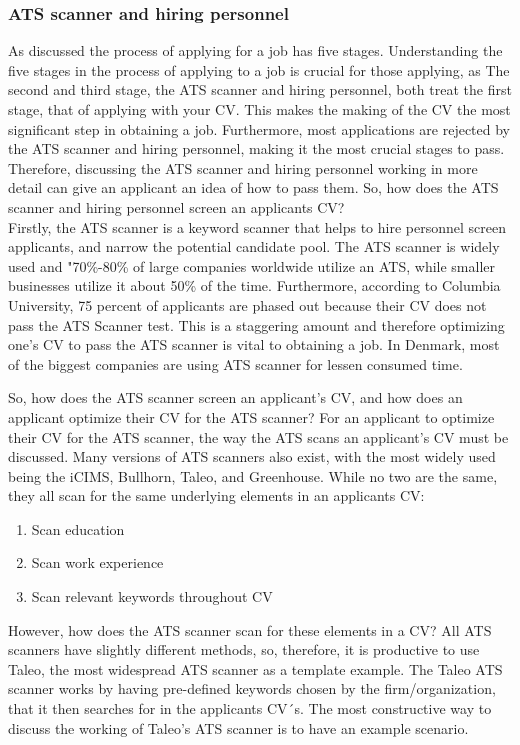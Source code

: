 \subsubsection{ATS scanner and hiring personnel}
As discussed the process of applying for a job has five stages.
Understanding the five stages in the process of applying to a job is crucial for those applying, as 
The second and third stage, the ATS scanner and hiring personnel, both treat the first stage, that of applying with your CV.
This makes the making of the CV the most significant step in obtaining a job.
Furthermore, most applications are rejected by the ATS scanner and hiring personnel, making it the most crucial stages to pass.
Therefore, discussing the ATS scanner and hiring personnel working in more detail can give an applicant an idea of how to pass them.
So, how does the ATS scanner and hiring personnel screen an applicants CV? \\

Firstly, the ATS scanner is a keyword scanner that helps to hire personnel screen applicants, and narrow the potential candidate pool.
The ATS scanner is widely used and "70\%-80\% of large companies worldwide utilize an ATS, while smaller businesses utilize it about 50\% of the time.\cite{ATS_Usage}
Furthermore, according to Columbia University, 75 percent of applicants are phased out because their CV does not pass the ATS Scanner test.
This is a staggering amount and therefore optimizing one's CV to pass the ATS scanner is vital to obtaining a job.
In Denmark, most of the biggest companies are using ATS scanner for lessen consumed time.\cite{ATS_Denmark}

So, how does the ATS scanner screen an applicant's CV, and how does an applicant optimize their CV for the ATS scanner?
For an applicant to optimize their CV for the ATS scanner, the way the ATS scans an applicant's CV must be discussed.
Many versions of ATS scanners also exist, with the most widely used being the iCIMS, Bullhorn, Taleo, and Greenhouse.
While no two are the same, they all scan for the same underlying elements in an applicants CV:
\begin{enumerate}
   \item Scan education
   \item Scan work experience
   \item Scan relevant keywords throughout CV
\end{enumerate}
However, how does the ATS scanner scan for these elements in a CV?
All ATS scanners have slightly different methods, so, therefore, it is productive to use Taleo, the most widespread ATS scanner as a template example.
The Taleo ATS scanner works by having pre-defined keywords chosen by the firm/organization, that it then searches for in the applicants CV´s.\cite{ATS_Taleo}
The most constructive way to discuss the working of Taleo's ATS scanner is to have an example scenario. \\

